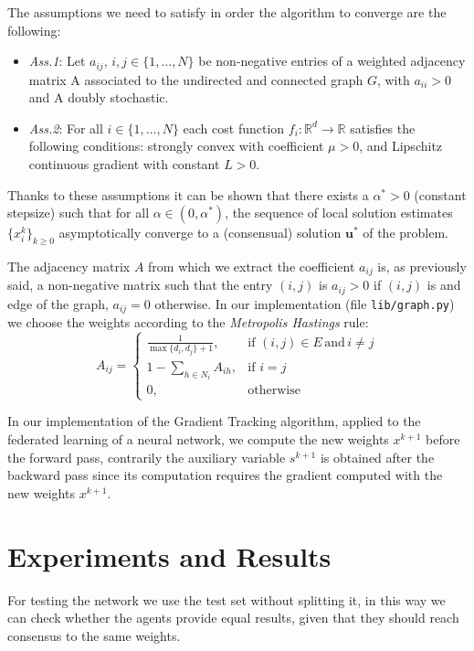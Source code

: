 \documentclass[a4paper,11pt,oneside]{book}
\begin{document}
\bigskip
The assumptions we need to satisfy in order the algorithm to converge are the following:
\begin{itemize}
\item \textit{Ass.1}: Let  $a_{ij}$, $i,j \in \{1, \ldots, N\}$ be non-negative entries of a weighted adjacency matrix A associated to the undirected and connected graph $G$, with $a_{ii}>0$ and A doubly stochastic.
\item \textit{Ass.2}: For all $i \in \{1, \ldots, N\}$ each cost function $f_i: \mathbb{R}^d \to \mathbb{R}$ satisfies the following conditions: strongly convex with coefficient $\mu >0$, and Lipschitz continuous gradient with constant $L>0$.
\end{itemize}
Thanks to these assumptions it can be shown that there exists a $\alpha^*>0$ (constant stepsize) such that for all $\alpha \in (0,\alpha^*)$, the sequence of local solution estimates $\{x_i^k\}_{k\geq0}$ asymptotically converge to a (consensual) solution $\textbf{u}^*$ of the problem.

\bigskip
The adjacency matrix $A$ from which we extract the coefficient $a_{ij}$ is, as previously said, a non-negative matrix such that the entry $(i,j)$ is $a_{ij}>0$ if $(i,j)$ is and edge of the graph, $a_{ij}=0$ otherwise.
In our implementation (file \texttt{lib/graph.py}) we choose the weights according to the \textit{Metropolis Hastings} rule:
\begin{equation}
A_{ij} = 
\begin{cases}
\frac{1}{\max\{d_i,d_j\}+1},  &\text{if } (i,j) \in E\, \text{and}\, i \neq j \\
1-\sum_{h \in N_i} A_{ih}, &\text{if }  i=j \\
0, &\text{otherwise}
\end{cases}
\end{equation}

\bigskip
In our implementation of the Gradient Tracking algorithm, applied to the federated learning of a neural network,  we compute the new weights $x^{k+1}$ before the forward pass, contrarily the auxiliary variable $s^{k+1}$ is obtained after the backward pass since its computation requires the gradient computed with the new weights $x^{k+1}$.

\section{Experiments and Results}
For testing the network we use the test set without splitting it, in this way we can check whether the agents provide equal results, given that they should reach consensus to the same weights. 
\end{document}
